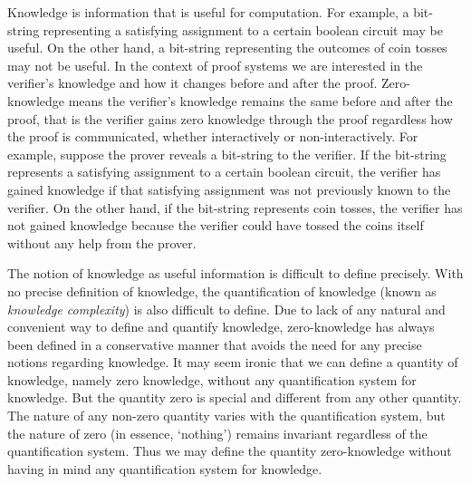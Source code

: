 \begin{remark}
    Knowledge is information that is useful for computation.
    For example, a bit-string representing a satisfying assignment to a certain boolean circuit may be useful.
    On the other hand, a bit-string representing the outcomes of coin tosses may not be useful.
    In the context of proof systems we are interested in the verifier's knowledge and how it changes before and after the proof.
    Zero-knowledge means the verifier's knowledge remains the same before and after the proof, that is the verifier gains zero knowledge through the proof regardless how the proof is communicated, whether interactively or non-interactively.
    For example, suppose the prover reveals a bit-string to the verifier.
    If the bit-string represents a satisfying assignment to a certain boolean circuit, the verifier has gained knowledge if that satisfying assignment was not previously known to the verifier.
    On the other hand, if the bit-string represents coin tosses, the verifier has not gained knowledge because the verifier could have tossed the coins itself without any help from the prover.

    The notion of knowledge as useful information is difficult to define precisely.
    With no precise definition of knowledge, the quantification of knowledge (known as \emph{knowledge complexity}) is also difficult to define.
    Due to lack of any natural and convenient way to define and quantify knowledge, zero-knowledge has always been defined in a conservative manner that avoids the need for any precise notions regarding knowledge.
    It may seem ironic that we can define a quantity of knowledge, namely zero knowledge, without any quantification system for knowledge.
    But the quantity zero is special and different from any other quantity.
    The nature of any non-zero quantity varies with the quantification system, but the nature of zero (in essence, `nothing') remains invariant regardless of the quantification system.
    Thus we may define the quantity zero-knowledge without having in mind any quantification system for knowledge.


\end{remark}

